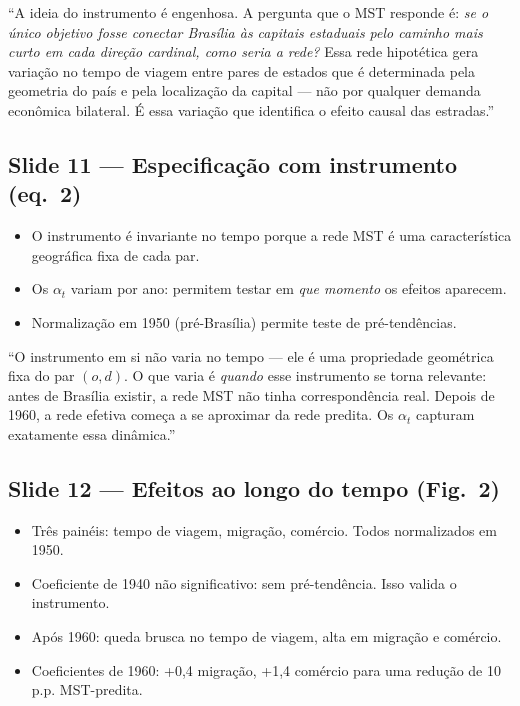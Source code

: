\documentclass[12pt, a4paper]{article}
\begin{document}
\begin{mdframed}[style=sintese]
``A ideia do instrumento é engenhosa. A pergunta que o MST responde é: \textit{se o único objetivo
fosse conectar Brasília às capitais estaduais pelo caminho mais curto em cada direção cardinal,
como seria a rede?} Essa rede hipotética gera variação no tempo de viagem entre pares de estados
que é determinada pela geometria do país e pela localização da capital --- não por qualquer
demanda econômica bilateral. É essa variação que identifica o efeito causal das estradas.''
\end{mdframed}

\subsection*{Slide 11 --- Especificação com instrumento (eq.\ 2)}

\begin{itemize}
    \item O instrumento é invariante no tempo porque a rede MST é uma característica geográfica fixa de cada par.
    \item Os $\alpha_t$ variam por ano: permitem testar em \textit{que momento} os efeitos aparecem.
    \item Normalização em 1950 (pré-Brasília) permite teste de pré-tendências.
\end{itemize}

\vspace{1cm}

\begin{mdframed}[style=sintese]
``O instrumento em si não varia no tempo --- ele é uma propriedade geométrica fixa do par $(o,d)$.
O que varia é \textit{quando} esse instrumento se torna relevante: antes de Brasília existir, a rede MST
não tinha correspondência real. Depois de 1960, a rede efetiva começa a se aproximar da rede predita.
Os $\alpha_t$ capturam exatamente essa dinâmica.''
\end{mdframed}

\subsection*{Slide 12 --- Efeitos ao longo do tempo (Fig.\ 2)}

\begin{itemize}
    \item Três painéis: tempo de viagem, migração, comércio. Todos normalizados em 1950.
    \item Coeficiente de 1940 não significativo: sem pré-tendência. Isso valida o instrumento.
    \item Após 1960: queda brusca no tempo de viagem, alta em migração e comércio.
    \item Coeficientes de 1960: +0,4 migração, +1,4 comércio para uma redução de 10 p.p. MST-predita.
\end{itemize}
\end{document}
